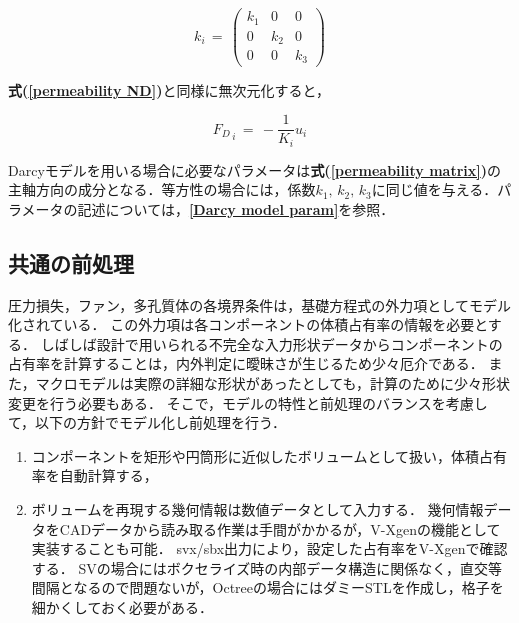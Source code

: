 \begin{equation}
k_{i} \,=\, 
\begin{pmatrix}
k_{1} & 0 & 0\\
0 & k_{2} & 0\\
0 & 0 & k_{3}
\end{pmatrix}
\label{permeability matrix}
\end{equation}

\textbf{式(\ref{permeability ND})}と同様に無次元化すると，

\begin{equation}
{F_{D}}_{\,i} \,=\, - \frac{1}{K_{i}} {u_{i}}
\label{NS_darcy aniso ND}
\end{equation}

Darcyモデルを用いる場合に必要なパラメータは\textbf{式(\ref{permeability matrix})}の主軸方向の成分となる．等方性の場合には，係数$k_{1},\,k_{2},\,k_{3}$に同じ値を与える．パラメータの記述については，\textbf{\ref{Darcy model param}}を参照．


%
\subsection{共通の前処理}
圧力損失，ファン，多孔質体の各境界条件は，基礎方程式の外力項としてモデル化されている．
この外力項は各コンポーネントの体積占有率の情報を必要とする．
しばしば設計で用いられる不完全な入力形状データからコンポーネントの占有率を計算することは，内外判定に曖昧さが生じるため少々厄介である．
また，マクロモデルは実際の詳細な形状があったとしても，計算のために少々形状変更を行う必要もある．
そこで，モデルの特性と前処理のバランスを考慮して，以下の方針でモデル化し前処理を行う．

\begin{enumerate}
\item コンポーネントを矩形や円筒形に近似したボリュームとして扱い，体積占有率を自動計算する，
\vspace{2mm}

\item ボリュームを再現する幾何情報は数値データとして入力する．
幾何情報データをCADデータから読み取る作業は手間がかかるが，V-Xgenの機能として実装することも可能．
svx/sbx出力により，設定した占有率をV-Xgenで確認する．
SVの場合にはボクセライズ時の内部データ構造に関係なく，直交等間隔となるので問題ないが，Octreeの場合にはダミーSTLを作成し，格子を細かくしておく必要がある．
\end{enumerate}

%
